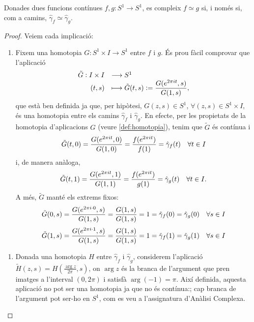 \documentclass[../main.tex]{subfiles}
\begin{document}
\begin{prop}
\label{prop:funcionscaminshomotops} Donades dues funcions contínues $f,g:S^1\rightarrow S^1$, es compleix $f\simeq g$ si, i només si, com a camins, $\hat{\gamma}_f\simeq \hat{\gamma}_g$.
\end{prop}
\begin{proof}
Veiem cada implicació:
\begin{enumerate}[($\Rightarrow$)]
    \item Fixem una homotopia $G:S^1\times I\rightarrow S^1$ entre $f$ i $g$. És prou fàcil comprovar que l'aplicació
    \begin{equation}
        \notag
        \begin{array}{rl}
            \tilde{G}:I\times I & \longrightarrow S^1 \\
            (t,s) & \longmapsto \tilde{G}(t,s):=\dfrac{G(e^{2\pi it},s)}{G(1,s)},
        \end{array}
    \end{equation}
    que està ben definida ja que, per hipòtesi, $G(z,s)\in S^1$, $\forall (z,s)\in S^1\times I$, és una homotopia entre els camins $\hat{\gamma}_f$ i $\hat{\gamma}_g$. En efecte, per les propietats de la homotopia d'aplicacions $G$ (veure \ref{def:homotopia}), tenim que $\tilde{G}$ és contínua i
    \begin{equation}
        \notag
        \tilde{G}(t,0) = \frac{G(e^{2\pi it},0)}{G(1,0)} = \frac{f(e^{2\pi it})}{f(1)} = \hat{\gamma}_f(t)\quad\forall t\in I
    \end{equation}
    i, de manera anàloga,
    \begin{equation}
        \notag
        \tilde{G}(t,1) = \frac{G(e^{2\pi it},1)}{G(1,1)} = \frac{f(e^{2\pi it})}{g(1)} = \hat{\gamma}_g(t)\quad \forall t\in I.
    \end{equation}
    A més, $\tilde{G}$ manté els extrems fixos:
    \begin{equation}
        \notag
        \tilde{G}(0,s) = \frac{G(e^{2\pi i\cdotp 0},s)}{G(1,s)} = \frac{G(1,s)}{G(1,s)} = 1 = \hat{\gamma}_f(0) = \hat{\gamma}_g(0)\quad \forall s\in I
    \end{equation}
    \begin{equation}
        \notag
        \tilde{G}(1,s) = \frac{G(e^{2\pi i\cdotp 1},s)}{G(1,s)} = \frac{G(1,s)}{G(1,s)} = 1 = \hat{\gamma}_f(1) = \hat{\gamma}_g(1)\quad \forall s\in I
    \end{equation}
\end{enumerate}
\begin{enumerate}[($\Leftarrow$)]
    \item Donada una homotopia $H$ entre $\hat{\gamma}_f$ i $\hat{\gamma}_g$, considerem l'aplicació $\tilde{H}(z,s) = H(\frac{\arg z}{2\pi},s)$, on $\arg z$ és la branca de l'argument que pren imatges a l'interval $(0,2\pi)$ i satisfà $\arg(-1) = \pi$. Així definida, aquesta aplicació no pot ser una homotopia ja que no és contínua:; cap branca de l'argument pot ser-ho en $S^1$, com es veu a l'assignatura d'Anàlisi Complexa.
    

\end{enumerate}
\end{proof}
\end{document}

